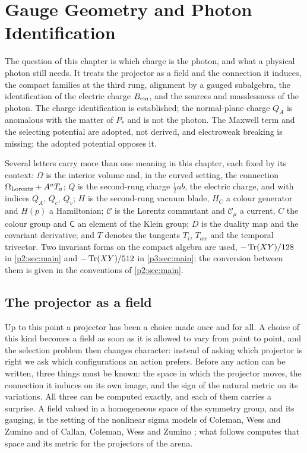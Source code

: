 \chapter{Gauge Geometry and Photon Identification}
\label{ch:ch08_photon}

The question of this chapter is which charge is the photon, and what a physical photon still needs. It treats the projector as a
field and the connection it induces, the compact families at the third rung, alignment by a gauged subalgebra, the identification of the
electric charge $B_{\rm em}$, and the sources and masslessness of the photon. The charge identification is established; the normal-plane
charge $Q_A$ is anomalous with the matter of $P_*$ and is not the photon. The Maxwell term and the selecting potential are adopted, not
derived, and electroweak breaking is missing; the adopted potential opposes it.

Several letters carry more than one meaning in this chapter, each fixed by its context: $\Omega$ is the interior volume and, in the curved
setting, the connection $\Omega_{\rm Lorentz}+A^aT_a$; $Q$ is the second-rung charge $\tfrac12ab$, the electric charge, and with indices $Q_A$, $Q_c$, $Q_v$;
$H$ is the second-rung vacuum blade, $H_C$ a colour generator and $H(p)$ a Hamiltonian; $\mathcal C$ is the Lorentz commutant and $\mathcal C_\mu$ a current, $C$
the colour group and $\mathsf C$ an element of the Klein group; $D$ is the duality map and the covariant derivative; and $T$ denotes the tangents $T_i$, $T_{aw}$ and
the temporal trivector. Two invariant forms on the compact algebra are used, $-\operatorname{Tr}(XY)/128$ in \cref{p2:sec:main} and $-\operatorname{Tr}(XY)/512$ in \cref{p3:sec:main}; the
conversion between them is given in the conventions of \cref{p2:sec:main}.



\section{The projector as a field}
\label{sec:fields}

Up to this point a projector has been a choice made once and for all. A choice of this kind becomes a field as soon as it is
allowed to vary from point to point, and the selection problem then changes character: instead of asking which projector is
right we ask which configurations an action prefers. Before any action can be written, three things must be known: the space in
which the projector moves, the connection it induces on its own image, and the sign of the natural metric on its variations. All
three can be computed exactly, and each of them carries a surprise. A field valued in a homogeneous space of the symmetry group, and its
gauging, is the setting of the nonlinear sigma models of Coleman, Wess and Zumino and of Callan, Coleman, Wess and Zumino
\cite{ColemanWessZumino69,CallanColemanWessZumino69}; what follows computes that space and its metric for the projectors of the arena.

